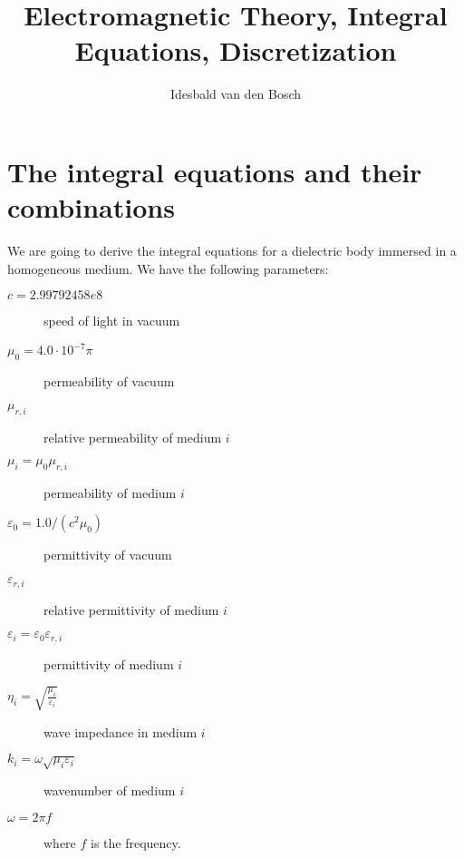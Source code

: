 \documentclass[a4paper,10pt]{book}
\title{Electromagnetic Theory, Integral Equations, Discretization}
\author{Idesbald van den Bosch}
\begin{document}
\maketitle
\tableofcontents


\chapter{The integral equations and their combinations}
%
\par
We are going to derive the integral equations for a dielectric body immersed in a homogeneous medium. We have the following parameters:
\begin{description}
\item [$c = 2.99792458e8$] speed of light in vacuum
\item [$\mu_0 = 4.0 \cdot 10^{-7} \pi$] permeability of vacuum
\item [$\mu_{r, i}$] relative permeability of medium $i$
\item [$\mu_i = \mu_0\mu_{r, i}$] permeability of medium $i$
\item [$\varepsilon_0 = 1.0/(c^2 \mu_0)$] permittivity of vacuum
\item [$\varepsilon_{r, i}$] relative permittivity of medium $i$
\item [$\varepsilon_i = \varepsilon_0\varepsilon_{r, i}$] permittivity of medium $i$
\item [$\eta_i = \sqrt{\frac{\mu_i}{\varepsilon_i}}$] wave impedance in medium $i$ 
\item [$k_i = \omega \sqrt{\mu_i \varepsilon_i}$] wavenumber of medium $i$
\item [$\omega = 2 \pi f$] where $f$ is the frequency.
\end{description}
\end{document}
